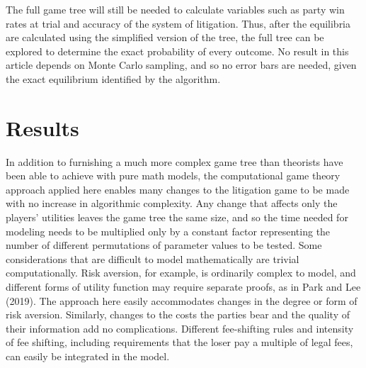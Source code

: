 \documentclass{article}
\begin{document}
The full game tree will still be needed to calculate variables such as party win rates at trial and accuracy of the system of litigation. Thus, after the equilibria are calculated using the simplified version of the tree, the full tree can be explored to determine the exact probability of every outcome. No result in this article depends on Monte Carlo sampling, and so no error bars are needed, given the exact equilibrium identified by the algorithm.

\section{Results} \label{results}

In addition to furnishing a much more complex game tree than theorists have been able to achieve with pure math models, the computational game theory approach applied here enables many changes to the litigation game to be made with no increase in algorithmic complexity. Any change that affects only the players' utilities leaves the game tree the same size, and so the time needed for modeling needs to be multiplied only by a constant factor representing the number of different permutations of parameter values to be tested. Some considerations that are difficult to model mathematically are trivial computationally. Risk aversion, for example, is ordinarily complex to model, and different forms of utility function may require separate proofs, as in Park and Lee (2019). The approach here easily accommodates changes in the degree or form of risk aversion. Similarly, changes to the costs the parties bear and the quality of their information add no complications. Different fee-shifting rules and intensity of fee shifting, including requirements that the loser pay a multiple of legal fees, can easily be integrated in the model. 
\end{document}
